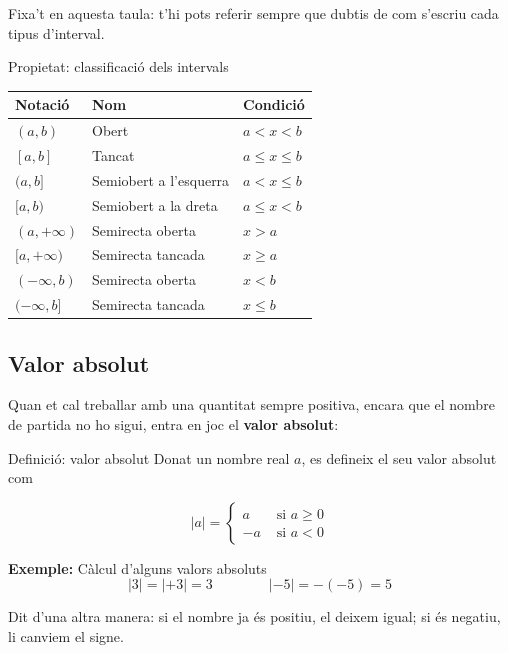 Fixa't en aquesta taula: t'hi pots referir sempre que dubtis de com s'escriu cada tipus d'interval.

\begin{propietat}{Propietat: classificació dels intervals}
\begin{center}
\begin{tabular}{lll}
\toprule
\textbf{Notació} & \textbf{Nom} & \textbf{Condició} \\
\midrule
$(a,b)$ & Obert & $a < x < b$ \\
$[a,b]$ & Tancat & $a \leq x \leq b$ \\
$(a,b]$ & Semiobert a l'esquerra & $a < x \leq b$ \\
$[a,b)$ & Semiobert a la dreta & $a \leq x < b$ \\
$(a,+\infty)$ & Semirecta oberta & $x > a$ \\
$[a,+\infty)$ & Semirecta tancada & $x \geq a$ \\
$(-\infty,b)$ & Semirecta oberta & $x < b$ \\
$(-\infty,b]$ & Semirecta tancada & $x \leq b$ \\
\bottomrule
\end{tabular}
\end{center}
\end{propietat}

\subsection{Valor absolut}

Quan et cal treballar amb una quantitat sempre positiva, encara que el nombre de partida no ho sigui, entra en joc el \textbf{valor absolut}:

\begin{definicio}{Definició: valor absolut}
Donat un nombre real $a$, es defineix el seu valor absolut com

\[
|a| = \begin{cases} a & \text{ si } a \geq 0 \\ -a & \text{ si } a <0 \end{cases}
\]
\end{definicio}

\begin{exemple}{\textbf{Exemple:} Càlcul d'alguns valors absoluts}
\[
|3| = |+3| = 3 \qquad\qquad |-5| = -(-5) = 5
\]
\end{exemple}

Dit d'una altra manera: si el nombre ja és positiu, el deixem igual; si és negatiu, li canviem el signe.

